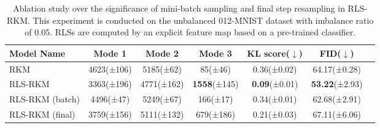 \begin{table}[ht]
\centering
\begin{tabular}{lcccccc}
\toprule
Model Name & Mode 1 & Mode 2 & \textbf{Mode 3} & KL score($\downarrow$) & FID($\downarrow$) \\
\midrule
RKM & 4623(±106) & 5185(±62) & 85(±46) & 0.36(±0.02) & 64.17(±0.28) \\
RLS-RKM & 3363(±196) & 4771(±162) & \textbf{1558}(±145) & \textbf{0.09}(±0.01) & \textbf{53.22}(±2.93) \\
RLS-RKM (batch) & 4496(±47) & 5249(±67) & 166(±17) & 0.34(±0.01) & 62.68(±2.91) \\
RLS-RKM (final) & 3759(±156) & 5111(±132) & 679(±186) & 0.21(±0.03) & 67.11(±6.06) \\
\bottomrule
\end{tabular}
\caption{Ablation study over the significance of mini-batch sampling and final step resampling in RLS-RKM. This experiment is conducted on the unbalanced 012-MNIST dataset with imbalance ratio of 0.05. RLSs are computed by an explicit feature map based on a pre-trained classifier.}
\label{expr-final-sample-or-mini-batch}
\end{table}